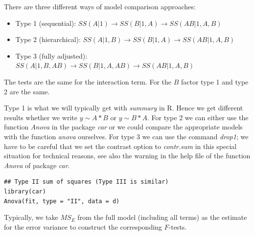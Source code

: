 There are three different ways of model comparison approaches:
\begin{itemize}
	\item Type 1 (sequential): $SS(A | 1) \to SS(B | 1, A) \to SS(AB | 1, A, B)$
	\item Type 2 (hierarchical): $SS(A | 1, B) \to SS(B | 1, A) \to SS(AB | 1, A, B)$
	\item Type 3 (fully adjusted): $SS(A | 1, B, AB) \to SS(B | 1, A, AB) \to SS(AB | 1, A, B)$
\end{itemize}

The tests are the same for the interaction term. For the $B$ factor type 1 and type 2 are the same. \medskip

Type 1 is what we will typically get with \textit{summary} in R. Hence we get different results whether we write $y \sim A * B$ or $y \sim B * A$. For type 2 we can either use the function \textit{Anova} in the package \textit{car} or we could compare the appropriate models with the function \textit{anova} ourselves. For type 3 we can use the command \textit{drop1}; we have to be careful that we set the contrast option to \textit{contr.sum} in this special situation for technical reasons, see also the warning in the help file of the function \textit{Anova} of package \textit{car}.

\begin{lstlisting}
## Type II sum of squares (Type III is similar)
library(car)
Anova(fit, type = "II", data = d)	
\end{lstlisting}

Typically, we take $MS_E$ from the full model (including all terms) as the estimate for the error variance to construct the corresponding $F$-tests.
